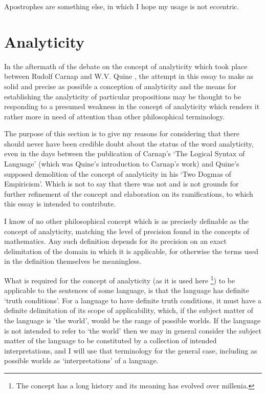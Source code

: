 \documentclass[10pt,titlepage]{book}
\begin{document}
Apostrophes are something else, in which I hope my usage is not eccentric.

\section{Analyticity}

In the aftermath of the debate on the concept of analyticity which took place between Rudolf Carnap and W.V. Quine \cite{carnap90}, the attempt in this essay to make as solid and precise as possible a conception of analyticity and the means for establishing the analyticity of particular propositions may be thought to be responding to a presumed weakness in the concept of analyticity which renders it rather more in need of attention than other philosophical terminology.

The purpose of this section is to give my reasons for considering that there should never have been credible doubt about the status of the word analyticity, even in the days between the publication of Carnap's `The Logical Syntax of Language' (which was Quine's introduction to Carnap's work) and Quine's supposed demolition of the concept of analyticity in his `Two Dogmas of Empiricism'.
Which is not to say that there was not and is not grounds for further refinement of the concept and elaboration on its ramifications, to which this essay is intended to contribute.

I know of no other philosophical concept which is as precisely definable as the concept of analyticity, matching the level of precision found in the concepts of mathematics.
Any such definition depends for its precision on an exact delimitation of the domain in which it is applicable, for otherwise the terms used in the definition themselves be meaningless.

What is required for the concept of analyticity (as it is used here%
\footnote{The concept has a long history and its meaning has evolved over millenia.}) to be applicable to the sentences of some language, is that the language has definite `truth conditions'.
For a language to have definite truth conditions, it must have a definite delimitation of its scope of applicability, which, if the subject matter of the language is 'the world', would be the range of possible worlds.
If the language is not intended to refer to `the world' then we may in general consider the subject matter of the language to be constituted by a collection of intended interpretations, and I will use that terminology for the general case, including as possible worlds as `interpretations' of a language.
\end{document}
